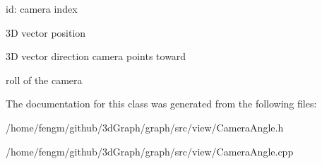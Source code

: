 id\+: camera index

3D vector position

3D vector direction camera points toward

roll of the camera

The documentation for this class was generated from the following files\+:\begin{DoxyCompactItemize}
\item 
/home/fengm/github/3d\+Graph/graph/src/view/Camera\+Angle.\+h\item 
/home/fengm/github/3d\+Graph/graph/src/view/Camera\+Angle.\+cpp\end{DoxyCompactItemize}
